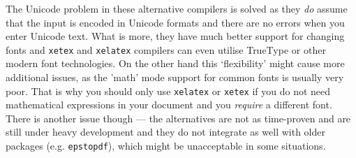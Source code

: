 \documentclass[
    draft
]{scrartcl}
\begin{document}
 
 
The Unicode problem in these alternative compilers is solved as they \emph{do}
assume that the input is encoded in Unicode formats and there are no errors when
you enter Unicode text.
%
What is more, they have much better support for changing fonts and \verb|xetex|
and \verb|xelatex| compilers can even utilise TrueType or other modern font
technologies.
%
On the other hand this `flexibility' might cause more additional issues, as
the 'math' mode support for common fonts is usually very poor.
%
That is why you should only use \verb|xelatex| or \verb|xetex| if you do not
need mathematical expressions in your document and you \emph{require} a
different font.
%
There is another issue though --- the alternatives are not as time-proven and
are still under heavy development and they do not integrate as well with older
packages (e.g.  \verb|epstopdf|), which might be unacceptable in some
situations.
\end{document}
